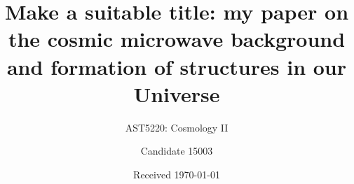 \documentclass[a4paper]{aa}
\begin{document}
 


   \title{Make a suitable title: my paper on the cosmic microwave background and formation of structures in our Universe}

   \subtitle{AST5220: Cosmology II}

   \author{Candidate 15003
          }


   \date{Received \today}





%
%


%







\end{document}
